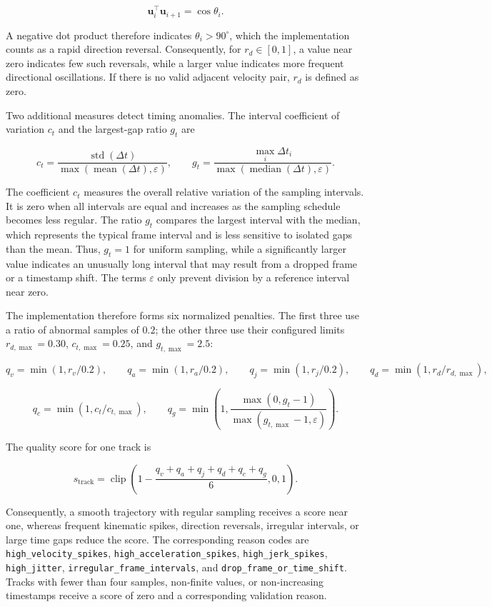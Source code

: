 \documentclass[11pt,oneside]{report}
\begin{document}
\[
\mathbf{u}_i^\top\mathbf{u}_{i+1}=\cos\theta_i.
\]

A negative dot product therefore indicates $\theta_i>90^\circ$, which the implementation counts as a rapid direction reversal. Consequently, for $r_d\in[0,1]$, a value near zero indicates few such reversals, while a larger value indicates more frequent directional oscillations. If there is no valid adjacent velocity pair, $r_d$ is defined as zero.

Two additional measures detect timing anomalies. The interval coefficient of variation $c_t$ and the largest-gap ratio $g_t$ are

\[
c_t =
\frac{\operatorname{std}(\Delta t)}
{\max\!\left(\operatorname{mean}(\Delta t),\varepsilon\right)},
\qquad
g_t =
\frac{\max_i\Delta t_i}
{\max\!\left(\operatorname{median}(\Delta t),\varepsilon\right)}.
\]

The coefficient $c_t$ measures the overall relative variation of the sampling intervals. It is zero when all intervals are equal and increases as the sampling schedule becomes less regular. The ratio $g_t$ compares the largest interval with the median, which represents the typical frame interval and is less sensitive to isolated gaps than the mean. Thus, $g_t=1$ for uniform sampling, while a significantly larger value indicates an unusually long interval that may result from a dropped frame or a timestamp shift. The terms $\varepsilon$ only prevent division by a reference interval near zero.

The implementation therefore forms six normalized penalties. The first three use a ratio of abnormal samples of $0.2$; the other three use their configured limits $r_{d,\max}=0.30$, $c_{t,\max}=0.25$, and $g_{t,\max}=2.5$:

\[
q_v=\min(1,r_v/0.2),
\qquad
q_a=\min(1,r_a/0.2),
\qquad
q_j=\min(1,r_j/0.2),
\qquad
q_d=\min(1,r_d/r_{d,\max}),
\]

\[
q_c=\min(1,c_t/c_{t,\max}),
\qquad
q_g=\min\!\left(
1,
\frac{\max(0,g_t-1)}
{\max(g_{t,\max}-1,\varepsilon)}
\right).
\]

The quality score for one track is

\[
s_{\text{track}} =
\operatorname{clip}\!\left(
1-\frac{q_v+q_a+q_j+q_d+q_c+q_g}{6},
0,1
\right).
\]

Consequently, a smooth trajectory with regular sampling receives a score near one, whereas frequent kinematic spikes, direction reversals, irregular intervals, or large time gaps reduce the score. The corresponding reason codes are \texttt{high\_velocity\_spikes},
\texttt{high\_acceleration\_spikes},
\texttt{high\_jerk\_spikes},
\texttt{high\_jitter},
\texttt{irregular\_frame\_intervals}, and
\texttt{drop\_frame\_or\_time\_shift}. Tracks with fewer than four samples, non-finite values, or non-increasing timestamps receive a score of zero and a corresponding validation reason.
\end{document}
